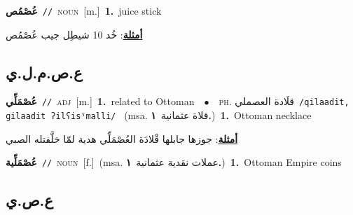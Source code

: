 \documentclass[10pt,a4paper,twoside]{article} %
\begin{document}
\begin{multicols}{2}
{\setlength\topsep{0pt}\textbf{\foreignlanguage{arabic}{عُصْمُص}}\ {\color{gray}\texttt{//}\color{black}}\ \textsc{noun}\ [m.]\ \textbf{1.}~juice stick\  \begin{flushright}\color{gray}\foreignlanguage{arabic}{\textbf{\underline{\foreignlanguage{arabic}{أمثلة}}}: خُد 10 شيطِل جيب عُصْمُص}\end{flushright}\color{black}} \vspace{2mm}

\vspace{-3mm}
\subsection*{\color{blue}\foreignlanguage{arabic}{ع.ص.م.ل.ي}\color{blue}{ (ntws)}} 

{\setlength\topsep{0pt}\textbf{\foreignlanguage{arabic}{عُصْمَلِّي}}\ {\color{gray}\texttt{//}\color{black}}\ \textsc{adj}\ [m.]\ \textbf{1.}~related to Ottoman\ \ $\bullet$\ \ \textsc{ph.} \color{gray} \foreignlanguage{arabic}{قلَادة العصملي}\color{black}\ {\color{gray}\texttt{/{\sffamily qilaadit, ɡilaadit ʔilʕisˤmalli}/}\color{black}}\ \color{gray} (msa. \foreignlanguage{arabic}{قلاة عثمانية}~\foreignlanguage{arabic}{\textbf{١.}})\color{black}\ \textbf{1.}~Ottoman necklace\  \begin{flushright}\color{gray}\foreignlanguage{arabic}{\textbf{\underline{\foreignlanguage{arabic}{أمثلة}}}: جوزها جابلها قْلادَة العُصْمَلِّي هدية لمّا خلَّفتله الصبي}\end{flushright}\color{black}} \vspace{2mm}

{\setlength\topsep{0pt}\textbf{\foreignlanguage{arabic}{عُصْمَلِّية}}\ {\color{gray}\texttt{//}\color{black}}\ \textsc{noun}\ [f.]\ \color{gray}(msa. \foreignlanguage{arabic}{عملات نقدية عثمانية}~\foreignlanguage{arabic}{\textbf{١.}})\color{black}\ \textbf{1.}~Ottoman Empire coins\ } \vspace{2mm}

\vspace{-3mm}
\subsection*{\color{blue}\foreignlanguage{arabic}{ع.ص.ي}\color{blue}{}} 


\end{multicols}
\end{document}
